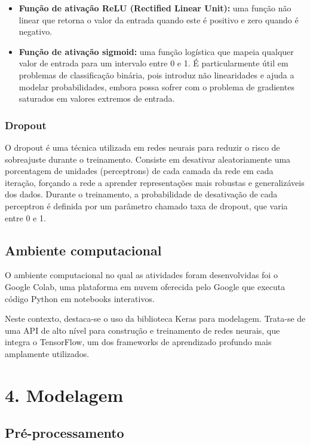 \documentclass[
  onecolumn]{article}
\begin{document}
\begin{itemize}
\item
  \textbf{Função de ativação ReLU (Rectified Linear Unit):} uma função
  não linear que retorna o valor da entrada quando este é positivo e
  zero quando é negativo.
\item
  \textbf{Função de ativação sigmoid:} uma função logística que mapeia
  qualquer valor de entrada para um intervalo entre 0 e 1. É
  particularmente útil em problemas de classificação binária, pois
  introduz não linearidades e ajuda a modelar probabilidades, embora
  possa sofrer com o problema de gradientes saturados em valores
  extremos de entrada.
\end{itemize}

\subsubsection{Dropout}\label{dropout}

O dropout é uma técnica utilizada em redes neurais para reduzir o risco
de sobreajuste durante o treinamento. Consiste em desativar
aleatoriamente uma porcentagem de unidades (perceptrons) de cada camada
da rede em cada iteração, forçando a rede a aprender representações mais
robustas e generalizáveis dos dados. Durante o treinamento, a
probabilidade de desativação de cada perceptron é definida por um
parâmetro chamado taxa de dropout, que varia entre 0 e 1.

\subsection{Ambiente computacional}\label{ambiente-computacional}

O ambiente computacional no qual as atividades foram desenvolvidas foi o
Google Colab, uma plataforma em nuvem oferecida pelo Google que executa
código Python em notebooks interativos.

Neste contexto, destaca-se o uso da biblioteca Keras para modelagem.
Trata-se de uma API de alto nível para construção e treinamento de redes
neurais, que integra o TensorFlow, um dos frameworks de aprendizado
profundo mais amplamente utilizados.

\section{4. Modelagem}\label{modelagem}

\subsection{Pré-processamento}\label{pruxe9-processamento}
\end{document}
